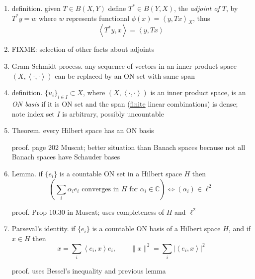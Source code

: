 \documentclass[11pt]{article}
\newcommand{\CC}{\mathbb{C}}
\newcommand{\ip}[2]{\ensuremath{\left<#1,#2\right>}}
\begin{document}
\begin{enumerate}
\item definition. given $T\in B(X,Y)$ define $T^*\in B(Y,X)$, the \emph{adjoint of $T$}, by $T^*y=w$ where $w$ represents functional $\phi(x) = \ip{y}{Tx}_X$, thus
    $$\ip{T^*y}{x} = \ip{y}{Tx}$$

\item FIXME: selection of other facts about adjoints

\item Gram-Schmidt process.  any sequence of vectors in an inner product space $(X,\ip{\cdot}{\cdot})$ can be replaced by an ON set with same span

\item definition. $\{u_i\}_{i\in I} \subset X$, where $(X,\ip{\cdot}{\cdot})$ is an inner product space, is an \emph{ON basis} if it is ON set and the span (\underline{finite} linear combinations) is dense; note index set $I$ is arbitrary, possibly uncountable

\item Theorem. every Hilbert space has an ON basis

proof. page 202 Muscat; better situation than Banach spaces because not all Banach spaces have Schauder bases

\item Lemma.  if $\{e_i\}$ is a countable ON set in a Hilbert space $H$ then
    $$\left(\sum_i \alpha_i e_i \text{ converges in $H$ for $\alpha_i\in \CC$}\right) \iff (\alpha_i)\in \ell^2$$

proof. Prop 10.30 in Muscat; uses completeness of $H$ and $\ell^2$

\item Parseval's identity. if $\{e_i\}$ is a countable ON basis of a Hilbert space $H$, and if $x\in H$ then
    $$x = \sum_i \ip{e_i}{x}e_i, \qquad \|x\|^2 = \sum_i |\ip{e_i}{x}|^2$$

proof. uses Bessel's inequality and previous lemma

\end{enumerate}
\end{document}
